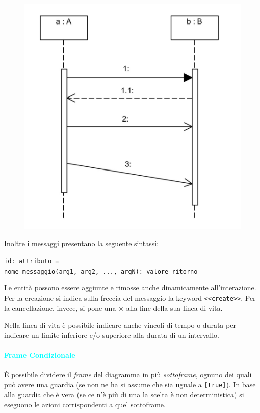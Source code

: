 \begin{figure}[H]
    \centering
    \includegraphics[scale=0.5]{img/messaggi_sequenza.png}
\end{figure}

Inoltre i messaggi presentano la seguente sintassi:

\begin{center}
    \verb|id: attributo = | \\
    \verb|nome_messaggio(arg1, arg2, ..., argN): valore_ritorno|
\end{center}

Le entità possono essere aggiunte e rimosse anche dinamicamente all'interazione.
Per la creazione si indica sulla freccia del messaggio la keyword \verb|<<create>>|.
Per la cancellazione, invece, si pone una $\times$ alla fine della sua linea di vita.


Nella linea di vita è possibile indicare anche vincoli di tempo o durata
per indicare un limite inferiore e/o superiore alla durata di un intervallo.

\paragraph{\textcolor{cyan}{Frame Condizionale}} È possibile dividere
il \emph{frame} del diagramma in più \emph{sottoframe}, ognuno dei quali
può avere una guardia (se non ne ha si assume che sia uguale a \verb|[true]|). In base
alla guardia che è vera (se ce n'è più di una la scelta è non deterministica) si
eseguono le azioni corrispondenti a quel sottoframe.

